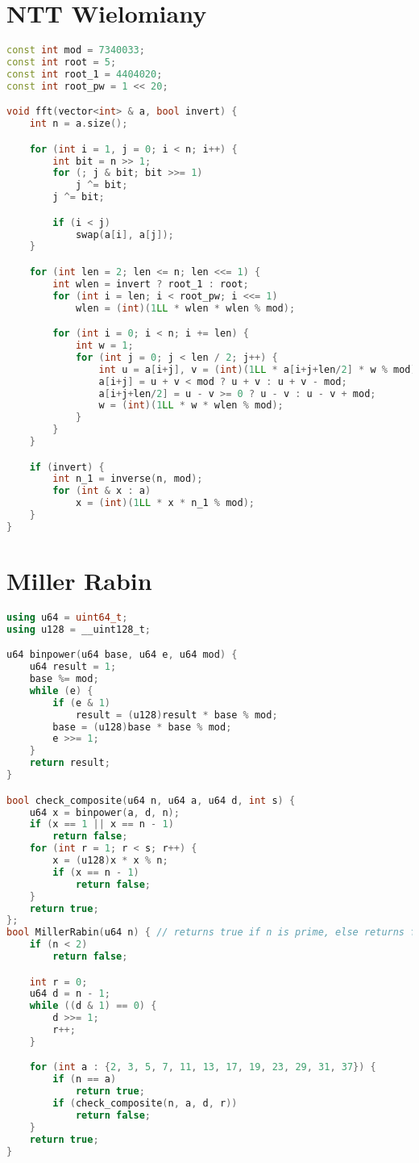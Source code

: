 \documentclass[notitlepage]{report}
\begin{document}
\section*{NTT Wielomiany}
\begin{lstlisting}[language=C++,basicstyle=\footnotesize]
const int mod = 7340033;
const int root = 5;
const int root_1 = 4404020;
const int root_pw = 1 << 20;

void fft(vector<int> & a, bool invert) {
    int n = a.size();

    for (int i = 1, j = 0; i < n; i++) {
        int bit = n >> 1;
        for (; j & bit; bit >>= 1)
            j ^= bit;
        j ^= bit;

        if (i < j)
            swap(a[i], a[j]);
    }

    for (int len = 2; len <= n; len <<= 1) {
        int wlen = invert ? root_1 : root;
        for (int i = len; i < root_pw; i <<= 1)
            wlen = (int)(1LL * wlen * wlen % mod);

        for (int i = 0; i < n; i += len) {
            int w = 1;
            for (int j = 0; j < len / 2; j++) {
                int u = a[i+j], v = (int)(1LL * a[i+j+len/2] * w % mod);
                a[i+j] = u + v < mod ? u + v : u + v - mod;
                a[i+j+len/2] = u - v >= 0 ? u - v : u - v + mod;
                w = (int)(1LL * w * wlen % mod);
            }
        }
    }

    if (invert) {
        int n_1 = inverse(n, mod);
        for (int & x : a)
            x = (int)(1LL * x * n_1 % mod);
    }
}
\end{lstlisting}
\section*{Miller Rabin}
\begin{lstlisting}[language=C++,basicstyle=\footnotesize]
using u64 = uint64_t;
using u128 = __uint128_t;

u64 binpower(u64 base, u64 e, u64 mod) {
    u64 result = 1;
    base %= mod;
    while (e) {
        if (e & 1)
            result = (u128)result * base % mod;
        base = (u128)base * base % mod;
        e >>= 1;
    }
    return result;
}

bool check_composite(u64 n, u64 a, u64 d, int s) {
    u64 x = binpower(a, d, n);
    if (x == 1 || x == n - 1)
        return false;
    for (int r = 1; r < s; r++) {
        x = (u128)x * x % n;
        if (x == n - 1)
            return false;
    }
    return true;
};
bool MillerRabin(u64 n) { // returns true if n is prime, else returns false.
    if (n < 2)
        return false;

    int r = 0;
    u64 d = n - 1;
    while ((d & 1) == 0) {
        d >>= 1;
        r++;
    }

    for (int a : {2, 3, 5, 7, 11, 13, 17, 19, 23, 29, 31, 37}) {
        if (n == a)
            return true;
        if (check_composite(n, a, d, r))
            return false;
    }
    return true;
}
\end{lstlisting}
\end{document}
